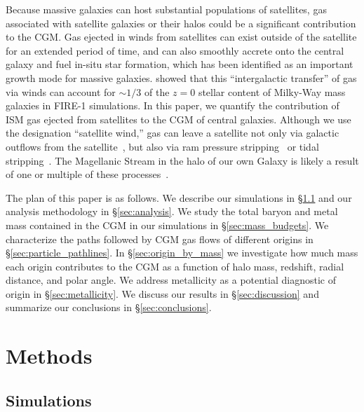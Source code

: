 \documentclass[fleqn,usenatbib]{mnras}
\begin{document}
\begin{enumerate}
Because massive galaxies can host substantial populations of satellites, gas associated with satellite galaxies or their halos could be a significant contribution to the CGM. 
Gas ejected in winds from satellites can exist outside of the satellite for an extended period of time, and can also smoothly accrete onto the central galaxy and fuel in-situ star formation, which has been identified as an important growth mode for massive galaxies.
\cite{Angles-Alcazar2017} showed that this ``intergalactic transfer'' of gas via winds can account for $\sim 1/3$ of the $z=0$ stellar content of Milky-Way mass galaxies in FIRE-1 simulations.
In this paper, we quantify the contribution of ISM gas ejected from satellites to the CGM of central galaxies. 
Although we use the designation ``satellite wind,'' gas can leave a satellite not only via galactic outflows from the satellite~\citep[e.g.][]{Wang1993,Barger2016,McClure-Griffiths2018}, but also via ram pressure stripping~\citep[e.g.][]{Gunn1972,Tonnesen2010,Yun2018} or tidal stripping~\citep[e.g.][]{Connors2006}.
The Magellanic Stream in the halo of our own Galaxy is likely a result of one or multiple of these processes~\citep[e.g.][]{DOnghia2016,Bustard2018}.

\end{enumerate}


The plan of this paper is as follows. 
We describe our simulations in \S\ref{sec:simulations} and our analysis methodology in \S\ref{sec:analysis}.
We study the total baryon and metal mass contained in the CGM in our simulations in \S\ref{sec:mass_budgets}. 
We characterize the paths followed by CGM gas flows of different origins in \S\ref{sec:particle_pathlines}.
In \S\ref{sec:origin_by_mass} we investigate how much mass each origin contributes to the CGM as a function of halo mass, redshift, radial distance, and polar angle.
We address metallicity as a potential diagnostic of origin in \S\ref{sec:metallicity}.  
We discuss our results in \S\ref{sec:discussion} and summarize our conclusions in \S\ref{sec:conclusions}.

\section{Methods}

\subsection{Simulations}
\label{sec:simulations}
\end{document}
